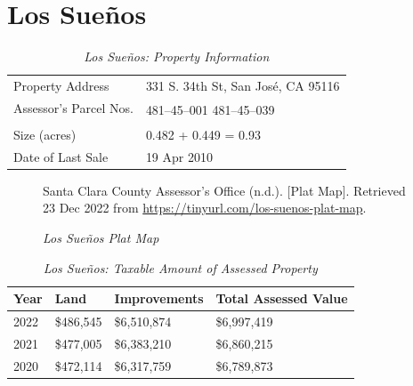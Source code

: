 
\clearpage
\section{Los Sueños}\label{sec:los-suenos-info}\indent

\begin{table}[htbp]
  \SingleSpacing%
  \caption[Los Sueños: Property Information]{\textit{Los Sueños: Property Information}}%
  \label{tab:los-sueños-prop-info}
  \begin{tabular}{ll}
    \toprule
    Property Address       & 331 S. 34th St, San José, CA 95116 \\
    Assessor's Parcel Nos. & \multirow[t]{2}{1in}{481–45–001 481–45–039} \\
    \\
    Size (acres)           & 0.482 + 0.449 = 0.93 \\
    Date of Last Sale      & 19 Apr 2010 \\
    \bottomrule
  \end{tabular}
\end{table}

\begin{figure}[hbtp]
  \caption[Los Sueños Plat Map]{\textit{Los Sueños Plat Map}}%
  \label{fig:los-sueños-plat-map}
  {Santa Clara County Assessor's Office (n.d.). [Plat Map]. Retrieved 23 Dec 2022 from \url{https://tinyurl.com/los-suenos-plat-map}.}
\end{figure}

\begin{table}[hbtp]
  \SingleSpacing%
  \caption[Los Sueños: Taxable Amount of Assessed Propery]{\textit{Los Sueños: Taxable Amount of Assessed Property}}%
  \label{tab:los-sueños-taxable-amount}
  \begin{tabular}{llll}
    \toprule
    Year & Land      & Improvements & Total Assessed Value \\
    \midrule
    2022 & \$486,545 & \$6,510,874  & \$6,997,419 \\
    2021 & \$477,005 & \$6,383,210  & \$6,860,215 \\
    2020 & \$472,114 & \$6,317,759  & \$6,789,873 \\
    \bottomrule
  \end{tabular}
\end{table}

